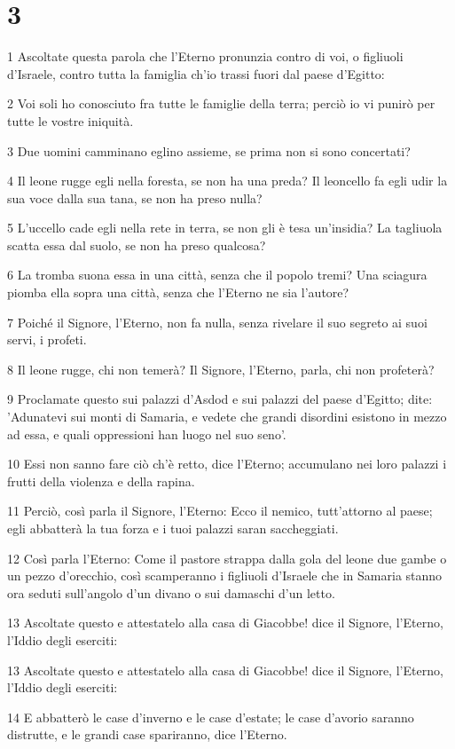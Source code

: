 \chapter{3}

\par 1 Ascoltate questa parola che l'Eterno pronunzia contro di voi, o figliuoli d'Israele, contro tutta la famiglia ch'io trassi fuori dal paese d'Egitto:
\par 2 Voi soli ho conosciuto fra tutte le famiglie della terra; perciò io vi punirò per tutte le vostre iniquità.
\par 3 Due uomini camminano eglino assieme, se prima non si sono concertati?
\par 4 Il leone rugge egli nella foresta, se non ha una preda? Il leoncello fa egli udir la sua voce dalla sua tana, se non ha preso nulla?
\par 5 L'uccello cade egli nella rete in terra, se non gli è tesa un'insidia? La tagliuola scatta essa dal suolo, se non ha preso qualcosa?
\par 6 La tromba suona essa in una città, senza che il popolo tremi? Una sciagura piomba ella sopra una città, senza che l'Eterno ne sia l'autore?
\par 7 Poiché il Signore, l'Eterno, non fa nulla, senza rivelare il suo segreto ai suoi servi, i profeti.
\par 8 Il leone rugge, chi non temerà? Il Signore, l'Eterno, parla, chi non profeterà?
\par 9 Proclamate questo sui palazzi d'Asdod e sui palazzi del paese d'Egitto; dite: 'Adunatevi sui monti di Samaria, e vedete che grandi disordini esistono in mezzo ad essa, e quali oppressioni han luogo nel suo seno'.
\par 10 Essi non sanno fare ciò ch'è retto, dice l'Eterno; accumulano nei loro palazzi i frutti della violenza e della rapina.
\par 11 Perciò, così parla il Signore, l'Eterno: Ecco il nemico, tutt'attorno al paese; egli abbatterà la tua forza e i tuoi palazzi saran saccheggiati.
\par 12 Così parla l'Eterno: Come il pastore strappa dalla gola del leone due gambe o un pezzo d'orecchio, così scamperanno i figliuoli d'Israele che in Samaria stanno ora seduti sull'angolo d'un divano o sui damaschi d'un letto.
\par 13 Ascoltate questo e attestatelo alla casa di Giacobbe! dice il Signore, l'Eterno, l'Iddio degli eserciti:
\par 13 Ascoltate questo e attestatelo alla casa di Giacobbe! dice il Signore, l'Eterno, l'Iddio degli eserciti:
\par 14 E abbatterò le case d'inverno e le case d'estate; le case d'avorio saranno distrutte, e le grandi case spariranno, dice l'Eterno.

